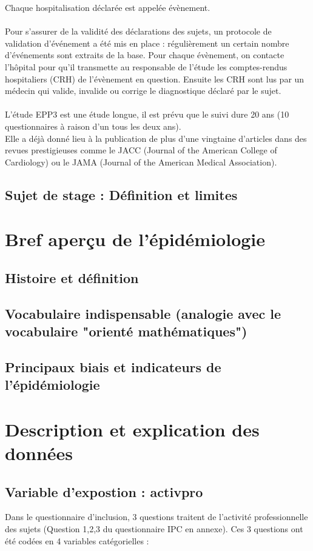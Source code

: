 \documentclass{book}
\begin{document}
Chaque hospitalisation déclarée est appelée évènement.\\
\\
Pour s'assurer de la validité des déclarations des sujets, un protocole de validation d'événement a été mis en place : régulièrement un certain nombre d'événements sont extraits de la base. Pour chaque évènement, on contacte l'hôpital pour qu'il transmette au responsable de l'étude les comptes-rendus hospitaliers (CRH) de l'évènement en question. Ensuite les CRH sont lus par un médecin qui valide, invalide ou corrige le diagnostique déclaré par le sujet.\\
\\
L'étude EPP3 est une étude longue, il est prévu que le suivi dure 20 ans (10 questionnaires à raison d'un tous les deux ans).\\
Elle a déjà donné lieu à la publication de plus d'une vingtaine d'articles dans des revues prestigieuses comme le JACC (Journal of the American College of Cardiology) ou le JAMA (Journal of the American Medical Association).
\subsection{Sujet de stage : Définition et limites}

\newpage
\section{Bref aperçu de l'épidémiologie}
\subsection{Histoire et définition}
\subsection{Vocabulaire indispensable (analogie avec le vocabulaire "orienté mathématiques")}
\subsection{Principaux biais et indicateurs de l'épidémiologie}

\newpage
\section{Description et explication des données}
\subsection{Variable d'expostion : activpro}
Dans le questionnaire d'inclusion, 3 questions traitent de l'activité professionnelle des sujets (Question 1,2,3 du questionnaire IPC en annexe). Ces 3 questions ont été codées en 4 variables catégorielles :
\end{document}

